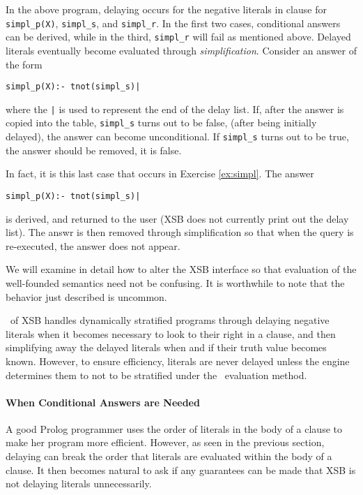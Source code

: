 In the above program, delaying occurs for the negative literals in
clause for {\tt simpl\_p(X)}, {\tt simpl\_s}, and {\tt simpl\_r}.
In the first two cases, conditional answers can be derived, while in
the third, {\tt simpl\_r} will fail as mentioned above.  Delayed
literals eventually become evaluated through {\em simplification}.
Consider an answer of the form 
\begin{verbatim}
simpl_p(X):- tnot(simpl_s)|
\end{verbatim}
where the {\tt |} is used to represent the end of the delay list.  If,
after the answer is copied into the table, {\tt simpl\_s} turns out to
be false, (after being initially delayed), the answer can become
unconditional.  If {\tt simpl\_s} turns out to be true, the answer
should be removed, it is false.

In fact, it is this last case that occurs in Exercise \ref{ex:simpl}.
The answer
\begin{verbatim}
simpl_p(X):- tnot(simpl_s)|
\end{verbatim}
is derived, and returned to the user (XSB does not currently print out
the delay list).  The answr is then removed through simplification so
that when the query is re-executed, the answer does not appear.

We will examine in detail how to alter the XSB interface so that
evaluation of the well-founded semantics need not be confusing.  It is
worthwhile to note that the behavior just described is uncommon.

\version\ of XSB handles dynamically stratified programs through
delaying negative literals when it becomes necessary to look to their
right in a clause, and then simplifying away the delayed literals when
and if their truth value becomes known.  However, to ensure
efficiency, literals are never delayed unless the engine determines
them to not to be stratified under the \LRD\ evaluation method.

\paragraph{When Conditional Answers are Needed} \label{sec:lrd}

A good Prolog programmer uses the order of literals in the body of a
clause to make her program more efficient.  However, as seen in the
previous section, delaying can break the order that literals are
evaluated within the body of a clause.  It then becomes natural to ask
if any guarantees can be made that XSB is not delaying literals
unnecessarily.

